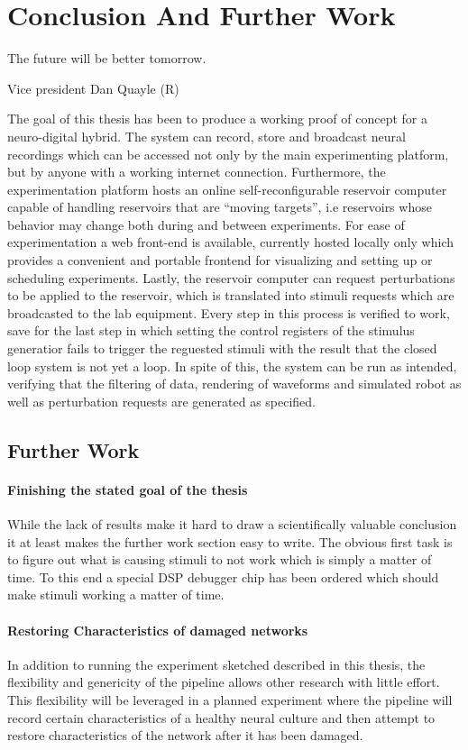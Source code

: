 \chapter{Conclusion And Further Work}
\epigraph{The future will be better tomorrow.}
{Vice president Dan Quayle (R)}
The goal of this thesis has been to produce a working proof of concept for
a neuro-digital hybrid.
The system can record, store and broadcast neural recordings which can be
accessed not only by the main experimenting platform, but by anyone with a
working internet connection.
Furthermore, the experimentation platform hosts an online self-reconfigurable
reservoir computer capable of handling reservoirs that are ``moving targets'',
i.e reservoirs whose behavior may change both during and between experiments.
For ease of experimentation a web front-end is available, currently hosted
locally only which provides a convenient and portable frontend for visualizing
and setting up or scheduling experiments.
Lastly, the reservoir computer can request perturbations to be applied to the
reservoir, which is translated into stimuli requests which are broadcasted to
the lab equipment.
Every step in this process is verified to work, save for the last step in which
setting the control registers of the stimulus generatior fails to trigger the
reguested stimuli with the result that the closed loop system is not yet a loop.
In spite of this, the system can be run as intended, verifying that the
filtering of data, rendering of waveforms and simulated robot as well as
perturbation requests are generated as specified.
\section{Further Work}
\subsubsection{Finishing the stated goal of the thesis}
While the lack of results make it hard to draw a scientifically valuable
conclusion it at least makes the further work section easy to write.
The obvious first task is to figure out what is causing stimuli to not work
which is simply a matter of time.
To this end a special DSP debugger chip has been ordered which should make
stimuli working a matter of time.
\subsubsection{Restoring Characteristics of damaged networks}
In addition to running the experiment sketched described in this thesis, the
flexibility and genericity of the pipeline allows other research with little
effort.
This flexibility will be leveraged in a planned experiment where the pipeline
will record certain characteristics of a healthy neural culture and then attempt
to restore characteristics of the network after it has been damaged.
